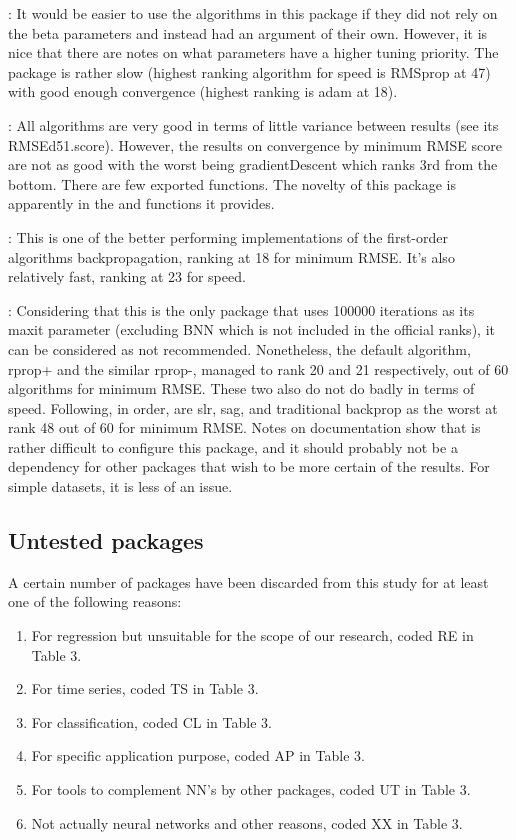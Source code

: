 \citep{R-automl}: It would be easier to use the
algorithms in this package if they did not rely on the beta parameters
and instead had an argument of their own. However, it is nice that there
are notes on what parameters have a higher tuning priority. The package
is rather slow (highest ranking algorithm for speed is RMSprop at 47)
with good enough convergence (highest ranking is adam at 18).

 \citep{R-deepdive}: All algorithms are very good in
terms of little variance between results (see its RMSEd51.score).
However, the results on convergence by minimum RMSE score are not as
good with the worst being gradientDescent which ranks 3rd from the
bottom. There are few exported functions. The novelty of this package is
apparently in the  and  functions it
provides.

 \citep{R-deepnet}: This is one of the better
performing implementations of the first-order algorithms
backpropagation, ranking at 18 for minimum RMSE. It's also relatively
fast, ranking at 23 for speed.

 \citep{R-neuralnet}: Considering that this is the
only package that uses 100000 iterations as its maxit parameter
(excluding BNN which is not included in the official ranks), it can be
considered as not recommended. Nonetheless, the default algorithm,
rprop+ and the similar rprop-, managed to rank 20 and 21 respectively,
out of 60 algorithms for minimum RMSE. These two also do not do badly in
terms of speed. Following, in order, are slr, sag, and traditional
backprop as the worst at rank 48 out of 60 for minimum RMSE. Notes on
documentation show that is rather difficult to configure this package,
and it should probably not be a dependency for other packages that wish
to be more certain of the results. For simple datasets, it is less of an
issue.

\hypertarget{untested-packages}{%
\subsection{Untested packages}\label{untested-packages}}

A certain number of packages have been discarded from this study for at
least one of the following reasons:

\begin{enumerate}
\def\labelenumi{\arabic{enumi}.}
\tightlist
\item
  For regression but unsuitable for the scope of our research, coded RE
  in Table 3.
\item
  For time series, coded TS in Table 3.
\item
  For classification, coded CL in Table 3.
\item
  For specific application purpose, coded AP in Table 3.
\item
  For tools to complement NN's by other packages, coded UT in Table 3.
\item
  Not actually neural networks and other reasons, coded XX in Table 3.
\end{enumerate}

